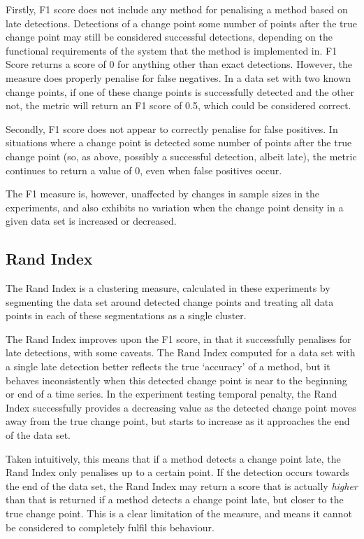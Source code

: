 \documentclass{uvamscse}	%
\begin{document}
Firstly, F1 score does not include any method for penalising a method based on late detections. Detections of a change point some number of points after the true change point may still be considered successful detections, depending on the functional requirements of the system that the method is implemented in. F1 Score returns a score of 0 for anything other than exact detections. However, the measure does properly penalise for false negatives. In a data set with two known change points, if one of these change points is successfully detected and the other not, the metric will return an F1 score of 0.5, which could be considered correct.

Secondly, F1 score does not appear to correctly penalise for false positives. In situations where a change point is detected some number of points after the true change point (so, as above, possibly a successful detection, albeit late), the metric continues to return a value of 0, even when false positives occur.

The F1 measure is, however, unaffected by changes in sample sizes in the experiments, and also exhibits no variation when the change point density in a given data set is increased or decreased.

\subsection{Rand Index}

The Rand Index is a clustering measure, calculated in these experiments by segmenting the data set around detected change points and treating all data points in each of these segmentations as a single cluster.

The Rand Index improves upon the F1 score, in that it successfully penalises for late detections, with some caveats. The Rand Index computed for a data set with a single late detection better reflects the true `accuracy' of a method, but it behaves inconsistently when this detected change point is near to the beginning or end of a time series. In the experiment testing temporal penalty, the Rand Index successfully provides a decreasing value as the detected change point moves away from the true change point, but starts to increase as it approaches the end of the data set.

Taken intuitively, this means that if a method detects a change point late, the Rand Index only penalises up to a certain point. If the detection occurs towards the end of the data set, the Rand Index may return a score that is actually \emph{higher} than that is returned if a method detects a change point late, but closer to the true change point. This is a clear limitation of the measure, and means it cannot be considered to completely fulfil this behaviour.
\end{document}

